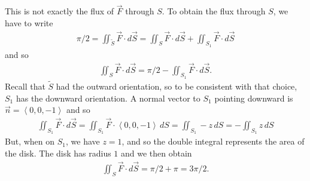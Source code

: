 	This is not exactly the flux of $\vec{F}$ through $S$. To obtain the flux through $S$, we have to write
		\begin{align*}
		\pi/2 = \iint_{\tilde{S}} \vec{F} \cdot d\vec{S} = \iint_S \vec{F} \cdot d\vec{S} + \iint_{S_1} \vec{F} \cdot d\vec{S} 
		\end{align*}
	and so
		\begin{align*}
		\iint_S \vec{F} \cdot d \vec{S} = \pi/2 - \iint_{S_1} \vec{F} \cdot d\vec{S} .
		\end{align*}
	Recall that $\tilde{S}$ had the outward orientation, so to be consistent with that choice, $S_1$ has the downward orientation. A normal vector to $S_1$ pointing downward is $\vec{n} = \left\langle 0, 0, -1 \right\rangle$ and so
		\begin{align*}
		\iint_{S_1} \vec{F} \cdot d\vec{S} = \iint_{S_1} \vec{F} \cdot \left\langle 0, 0, -1 \right\rangle \, dS = \iint_{S_1} -z \, dS = - \iint_{S_1} z \, dS
		\end{align*}
	But, when on $S_1$, we have $z = 1$, and so the double integral represents the area of the disk. The disk has radius $1$ and we then obtain
		\begin{align*}
		\iint_S \vec{F} \cdot d \vec{S} = \pi/2 + \pi = 3\pi/2 .
		\end{align*}


